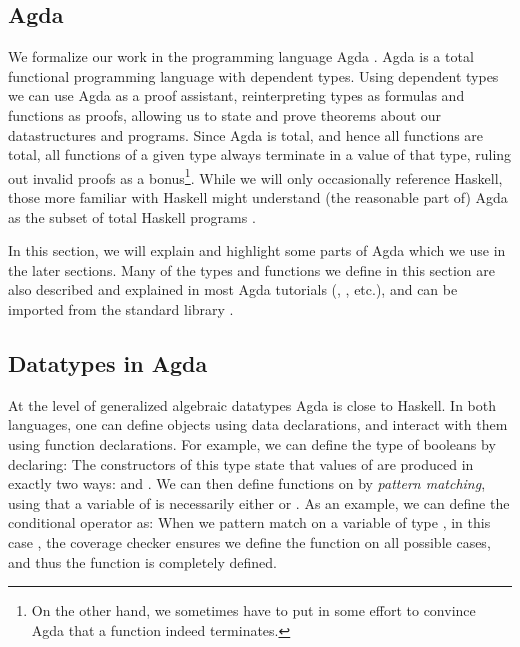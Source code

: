 \subsection{Agda}\label{sec:background-agda}
We formalize our work in the programming language Agda \cite{agda}. Agda is a total functional programming language with dependent types. Using dependent types we can use Agda as a proof assistant, reinterpreting types as formulas and functions as proofs, allowing us to state and prove theorems about our datastructures and programs. Since Agda is total, and hence all functions are total, all functions of a given type always terminate in a value of that type, ruling out invalid proofs as a bonus\footnote{On the other hand, we sometimes have to put in some effort to convince Agda that a function indeed terminates.}. While we will only occasionally reference Haskell, those more familiar with Haskell might understand (the reasonable part of) Agda as the subset of total Haskell programs \cite{agda2hs}.

In this section, we will explain and highlight some parts of Agda which we use in the later sections. Many of the types and functions we define in this section are also described and explained in most Agda tutorials (\cite{ulftutorial}, \cite{plfa}, etc.), and can be imported from the standard library \cite{agdastdlib}.


\subsection{Datatypes in Agda}\label{sec:background-data}
At the level of generalized algebraic datatypes Agda is close to Haskell. In both languages, one can define objects using data declarations, and interact with them using function declarations. For example, we can define the type of booleans by declaring:
The constructors of this type state that values of  are produced in exactly two ways:  and . We can then define functions on  by \emph{pattern matching}, using that a variable of  is necessarily either  or . As an example, we can define the conditional operator as:
When we pattern match on a variable of type , in this case , the coverage checker ensures we define the function on all possible cases, and thus the function is completely defined.

